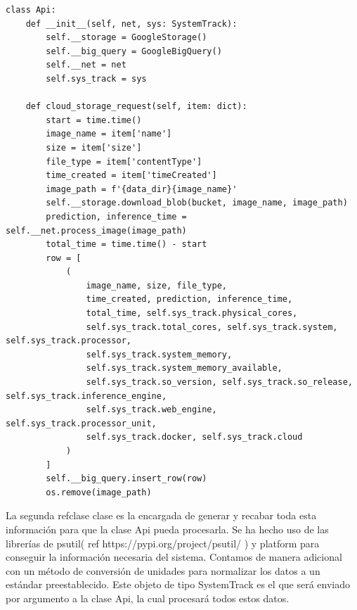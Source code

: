 \begin{lstlisting}[caption=Api, label=lst:api, float=t]
    class Api:
    def __init__(self, net, sys: SystemTrack):
        self.__storage = GoogleStorage()
        self.__big_query = GoogleBigQuery()
        self.__net = net
        self.sys_track = sys

    def cloud_storage_request(self, item: dict):
        start = time.time()
        image_name = item['name']
        size = item['size']
        file_type = item['contentType']
        time_created = item['timeCreated']
        image_path = f'{data_dir}{image_name}'
        self.__storage.download_blob(bucket, image_name, image_path)
        prediction, inference_time = self.__net.process_image(image_path)
        total_time = time.time() - start
        row = [
            (
                image_name, size, file_type,
                time_created, prediction, inference_time,
                total_time, self.sys_track.physical_cores,
                self.sys_track.total_cores, self.sys_track.system, self.sys_track.processor,
                self.sys_track.system_memory,
                self.sys_track.system_memory_available,
                self.sys_track.so_version, self.sys_track.so_release, self.sys_track.inference_engine,
                self.sys_track.web_engine, self.sys_track.processor_unit,
                self.sys_track.docker, self.sys_track.cloud
            )
        ]
        self.__big_query.insert_row(row)
        os.remove(image_path)
\end{lstlisting}
La segunda refclase clase es la encargada de generar y recabar toda esta información para que la clase Api pueda procesarla.
Se ha hecho uso de las librerías de psutil( ref https://pypi.org/project/psutil/ ) y platform para conseguir la información necesaria del sistema.
Contamos de manera adicional con un método de conversión de unidades para normalizar los datos a un estándar preestablecido.
Este objeto de tipo SystemTrack es el que será enviado por argumento a la clase Api, la cual procesará todos estos datos.
